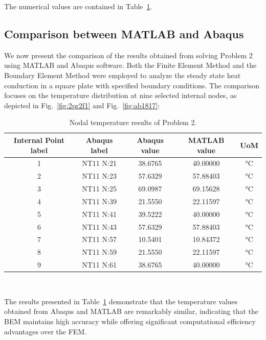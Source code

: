 The numerical values are contained in Table~\ref{table:stedyRes}.

\subsection{Comparison between MATLAB and Abaqus}
\label{sub:comparison3}%

We now present the comparison of the results obtained from solving Problem 2 using MATLAB and Abaqus software. Both the Finite Element Method and the Boundary Element Method were employed to analyze the steady state heat conduction in a square plate with specified boundary conditions. The comparison focuses on the temperature distribution at nine selected internal nodes, as depicted in Fig.~\ref{fig:2pr2f1} and Fig.~\ref{fig:ab1817}:

\begin{table}[H]
    \centering 
    \begin{tabular}{ccccc}
    \hline
    \rowcolor{bluepoli!40} %
    Internal Point label & Abaqus label & Abaqus value & MATLAB value & UoM \\
    \hline
    1 & NT11 N:21 & 38.6765 & 40.00000 & °C \\
    2 & NT11 N:23 & 57.6329 & 57.88403 & °C \\
    3 & NT11 N:25 & 69.0987 & 69.15628 & °C \\
    4 & NT11 N:39 & 21.5550 & 22.11597 & °C \\
    5 & NT11 N:41 & 39.5222 & 40.00000 & °C \\
    6 & NT11 N:43 & 57.6329 & 57.88403 & °C \\
    7 & NT11 N:57 & 10.5401 & 10.84372 & °C \\
    8 & NT11 N:59 & 21.5550 & 22.11597 & °C \\
    9 & NT11 N:61 & 38.6765 & 40.00000 & °C \\
    \hline
    \end{tabular}
    \\[10pt]
    \caption{Nodal temperature results of Problem 2.}
    \label{table:stedyRes}
\end{table}

The results presented in Table~\ref{table:stedyRes} demonstrate that the temperature values obtained from Abaqus and MATLAB are remarkably similar, indicating that the BEM maintains high accuracy while offering significant computational efficiency advantages over the FEM. 

